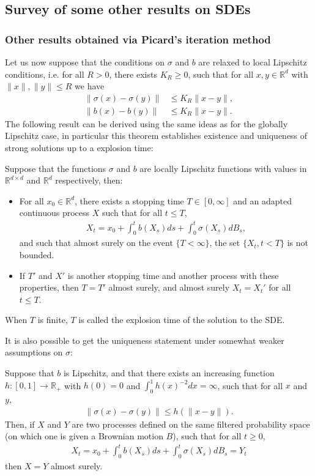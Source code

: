 \documentclass[../mainfile.tex]{subfiles}
\begin{document}
\subsection{Survey of some other results on SDEs}
\subsubsection{Other results obtained via Picard's iteration method}
Let us now suppose that the conditions on $\sigma$ and $b$ are relaxed to local Lipschitz conditions,  i.e. for all $R>0$, there exists $K_R \geq 0$, such that for all $x,y \in \mathbb{R}^d$ with $\|x\|,\|y\| \leq R$ we have 
\begin{align*}
\| \sigma(x)-\sigma(y)\| &\leq K_R\|x-y\|, \\
\| b(x)-b(y)\| & \leq K_R\|x-y\|.
\end{align*}
The following result can be derived using the same ideas as for the globally Lipschitz case, in particular this theorem establishes existence and uniqueness of strong solutions up to a explosion time:
\begin{thm} Suppose that the functions $\sigma$ and $b$ are locally Lipschitz functions with values in $\mathbb{R}^{d \times d}$ and $\mathbb{R}^d$ respectively, then:
\begin{itemize}
\item For all $x_0 \in \mathbb{R}^d$, there exists a stopping time $T \in [0, \infty]$ and an adapted continuous process $X$ such that for all $t \leq T$, 
\begin{align*}
X_t = x_0 + \int_0^t b(X_s)ds + \int_0^t \sigma (X_s)dB_s,
\end{align*}
and such that almost surely on the event $\{T < \infty\}$, the set $\{X_t, t <T\}$ is not bounded.
\item If $T'$ and $X'$ is another stopping time and another process with these properties, then $T=T'$ almost surely,  and almost surely $X_t=X_t'$ for all $t \leq T$.
\end{itemize}
When $T$ is finite, $T$ is called the explosion time of the solution to the SDE. 
\end{thm}
It is also possible to get the uniqueness statement under somewhat weaker assumptions on $\sigma$:
\begin{thm} Suppose that $b$ is Lipschitz, and that there exists an increasing function $h: [0, 1] \to \mathbb{R}_+$ with $h(0)=0$ and $\int_0^1 h(x)^{-2}dx= \infty$, such that for all $x$ and $y$,  
\begin{align*}
\| \sigma(x)-\sigma(y)\| \leq h(\|x-y\|).
\end{align*}
Then, if $X$ and $Y$ are two processes defined on the same filtered probability space (on which one is given a Brownian motion $B$), such that for all $t \geq 0$, 
\begin{align*}
X_t = x_0 + \int_0^t b(X_s)ds + \int_0^t \sigma(X_s)dB_s = Y_t
\end{align*}
then $X=Y$ almost surely. 
\end{thm}
\newpage
\end{document}
